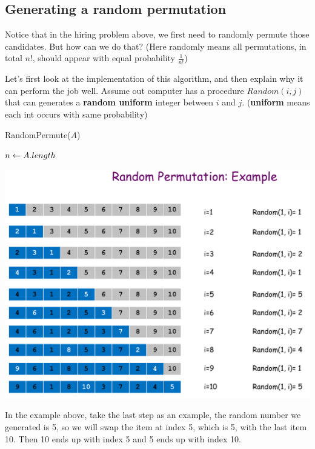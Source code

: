 \documentclass[11pt, a4paper]{COMP3711}
\begin{document}
\begin{spacing}{1.5}
    \section{Generating a random permutation}

    Notice that in the hiring problem above, we first need to randomly
    permute those candidates. But how can we do that? 
    (Here randomly means all permutations, in total $n!$, should 
    appear with equal probability $\frac{1}{n!}$)

    Let's first look at the implementation of this algorithm, and 
    then explain why it can perform the job well. 
    Assume out computer has a procedure $Random(i, j)$ that can  
    generates a {\bf random uniform} integer between $i$ and $j$.
    ({\bf uniform} means each int occurs with same probability)

    \begin{algorithm*}
        \caption{RandomPermute($A$)}

        $n\leftarrow A.length$

    \end{algorithm*}

    \begin{center}
        \includegraphics[scale=0.2]{images/03-permutation-eg.jpeg}
    \end{center}

    In the example above, take the last step as an example, 
    the random number we generated is 5, so we will 
    swap the item at index 5, which is 5, with the last item 
    10. Then 10 ends up with index 5 and 5 ends up with index 10.


\end{spacing}
\end{document}
